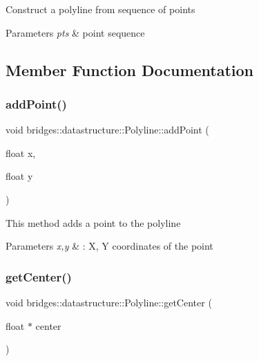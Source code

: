 Construct a polyline from sequence of points 
\begin{DoxyParams}{Parameters}
{\em pts} & point sequence \\
\hline
\end{DoxyParams}


\subsection{Member Function Documentation}
\mbox{\label{classbridges_1_1datastructure_1_1_polyline_a00698223911f07cafca29ec80c507678}} 
\subsubsection{\texorpdfstring{addPoint()}{addPoint()}}
{\footnotesize\ttfamily void bridges\+::datastructure\+::\+Polyline\+::add\+Point (\begin{DoxyParamCaption}\item[{float}]{x,  }\item[{float}]{y }\end{DoxyParamCaption})\hspace{0.3cm}{\ttfamily [inline]}}

This method adds a point to the polyline


\begin{DoxyParams}{Parameters}
{\em x,y} & \+: X, Y coordinates of the point \\
\hline
\end{DoxyParams}
\mbox{\label{classbridges_1_1datastructure_1_1_polyline_ad0783deb77873eda19528681bbbca25c}} 
\subsubsection{\texorpdfstring{getCenter()}{getCenter()}}
{\footnotesize\ttfamily void bridges\+::datastructure\+::\+Polyline\+::get\+Center (\begin{DoxyParamCaption}\item[{float $\ast$}]{center }\end{DoxyParamCaption})\hspace{0.3cm}{\ttfamily [inline]}}

